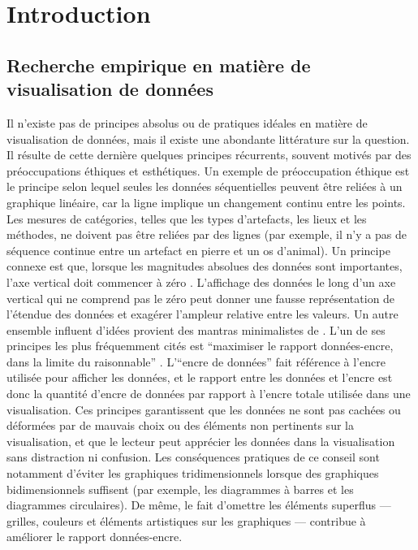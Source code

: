 \documentclass[
  french,
]{scrbook}
\begin{document}
\hypertarget{introduction-1}{%
\chapter{Introduction}\label{introduction-1}}

\hypertarget{recherche-empirique-en-matiuxe8re-de-visualisation-de-donnuxe9es}{%
\section{Recherche empirique en matière de visualisation de données}\label{recherche-empirique-en-matiuxe8re-de-visualisation-de-donnuxe9es}}

Il n'existe pas de principes absolus ou de pratiques idéales en matière de visualisation de données, mais il existe une abondante littérature sur la question. Il résulte de cette dernière quelques principes récurrents, souvent motivés par des préoccupations éthiques et esthétiques. Un exemple de préoccupation éthique est le principe selon lequel seules les données séquentielles peuvent être reliées à un graphique linéaire, car la ligne implique un changement continu entre les points. Les mesures de catégories, telles que les types d'artefacts, les lieux et les méthodes, ne doivent pas être reliées par des lignes (par exemple, il n'y a pas de séquence continue entre un artefact en pierre et un os d'animal). Un principe connexe est que, lorsque les magnitudes absolues des données sont importantes, l'axe vertical doit commencer à zéro \autocite{robbins2005,strange2007}. L'affichage des données le long d'un axe vertical qui ne comprend pas le zéro peut donner une fausse représentation de l'étendue des données et exagérer l'ampleur relative entre les valeurs. Un autre ensemble influent d'idées provient des mantras minimalistes de \textcite{tufte2001}. L'un de ses principes les plus fréquemment cités est ``maximiser le rapport données-encre, dans la limite du raisonnable'' \autocite{tufte1990}. L'``encre de données'' fait référence à l'encre utilisée pour afficher les données, et le rapport entre les données et l'encre est donc la quantité d'encre de données par rapport à l'encre totale utilisée dans une visualisation. Ces principes garantissent que les données ne sont pas cachées ou déformées par de mauvais choix ou des éléments non pertinents sur la visualisation, et que le lecteur peut apprécier les données dans la visualisation sans distraction ni confusion. Les conséquences pratiques de ce conseil sont notamment d'éviter les graphiques tridimensionnels lorsque des graphiques bidimensionnels suffisent (par exemple, les diagrammes à barres et les diagrammes circulaires). De même, le fait d'omettre les éléments superflus --- grilles, couleurs et éléments artistiques sur les graphiques --- contribue à améliorer le rapport données-encre.
\end{document}
